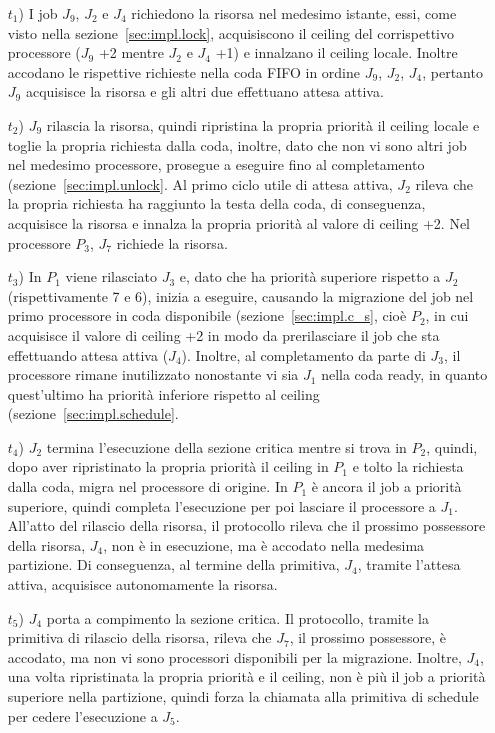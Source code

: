 \begin{itemize}
	\item [$t_1$)] I job $J_9$, $J_2$ e $J_4$ richiedono la risorsa nel medesimo istante, essi, come visto nella sezione~\ref{sec:impl.lock}, acquisiscono il ceiling del corrispettivo processore ($J_9$ +2 mentre $J_2$ e $J_4$ +1) e innalzano il ceiling locale. Inoltre accodano le rispettive richieste nella coda FIFO in ordine {$J_9$, $J_2$, $J_4$}, pertanto $J_9$ acquisisce la risorsa e gli altri due effettuano attesa attiva.
	\item [$t_2$)] $J_9$ rilascia la risorsa, quindi ripristina la propria priorità il ceiling locale e toglie la propria richiesta dalla coda, inoltre, dato che non vi sono altri job nel medesimo processore, prosegue a eseguire fino al completamento (sezione~\ref{sec:impl.unlock}. Al primo ciclo utile di attesa attiva, $J_2$ rileva che la propria richiesta ha raggiunto la testa della coda, di conseguenza, acquisisce la risorsa e innalza la propria priorità al valore di ceiling +2. Nel processore $P_3$, $J_7$ richiede la risorsa.
	\item [$t_3$)] In $P_1$ viene rilasciato $J_3$ e, dato che ha priorità superiore rispetto a $J_2$ (rispettivamente 7 e 6), inizia a eseguire, causando la migrazione del job nel primo processore in coda disponibile (sezione~\ref{sec:impl.c_s}, cioè $P_2$, in cui acquisisce il valore di ceiling +2 in modo da prerilasciare il job che sta effettuando attesa attiva ($J_4$). Inoltre, al completamento da parte di $J_3$, il processore rimane inutilizzato nonostante vi sia $J_1$ nella coda ready, in quanto quest'ultimo ha priorità inferiore rispetto al ceiling (sezione~\ref{sec:impl.schedule}.
	\item [$t_4$)] $J_2$ termina l'esecuzione della sezione critica mentre si trova in $P_2$, quindi, dopo aver ripristinato la propria priorità  il ceiling in $P_1$ e tolto la richiesta dalla coda, migra nel processore di origine. In $P_1$ è ancora il job a priorità superiore, quindi completa l'esecuzione per poi lasciare il processore a $J_1$. All'atto del rilascio della risorsa, il protocollo rileva che il prossimo possessore della risorsa, $J_4$, non è in esecuzione, ma è accodato nella medesima partizione. Di conseguenza, al termine della primitiva, $J_4$, tramite l'attesa attiva, acquisisce autonomamente la risorsa.
	\item [$t_5$)] $J_4$ porta a compimento la sezione critica. Il protocollo, tramite la primitiva di rilascio della risorsa, rileva che $J_7$, il prossimo possessore, è accodato, ma non vi sono processori disponibili per la migrazione. Inoltre, $J_4$, una volta ripristinata la propria priorità e il ceiling, non è più il job a priorità superiore nella partizione, quindi forza la chiamata alla primitiva di schedule per cedere l'esecuzione a $J_5$.

\end{itemize}
